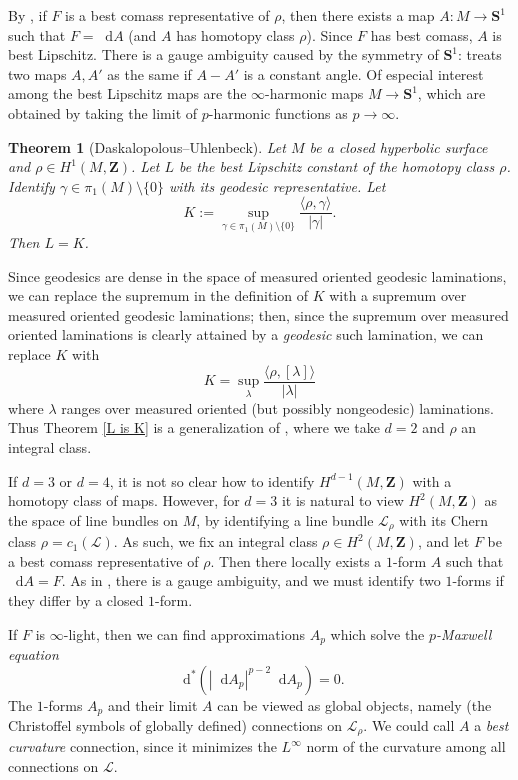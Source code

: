 \documentclass[reqno,11pt]{amsart}
\newcommand{\ZZ}{\mathbf{Z}}
\newcommand{\Sph}{\mathbf S}
\newcommand*\dif{\mathop{}\!\mathrm{d}}
\newcommand{\dfn}[1]{\emph{#1}\index{#1}}
\newtheorem{theorem}{Theorem}[section]
\theoremstyle{definition}
\numberwithin{equation}{section}
\begin{document}
By \cite[\S2.1]{daskalopoulos2020transverse}, if $F$ is a best comass representative of $\rho$, then there exists a map $A: M \to \Sph^1$ such that $F = \dif A$ (and $A$ has homotopy class $\rho$).
Since $F$ has best comass, $A$ is best Lipschitz.
There is a gauge ambiguity caused by the symmetry of $\Sph^1$: \cite{daskalopoulos2020transverse} treats two maps $A, A'$ as the same if $A - A'$ is a constant angle.
Of especial interest among the best Lipschitz maps are the $\infty$-harmonic maps $M \to \Sph^1$, which are obtained by taking the limit of $p$-harmonic functions as $p \to \infty$.

\begin{theorem}[Daskalopolous--Uhlenbeck]
Let $M$ be a closed hyperbolic surface and $\rho \in H^1(M, \ZZ)$.
Let $L$ be the best Lipschitz constant of the homotopy class $\rho$.
Identify $\gamma \in \pi_1(M) \setminus \{0\}$ with its geodesic representative.
Let
$$K := \sup_{\gamma \in \pi_1(M) \setminus \{0\}} \frac{\langle \rho, \gamma\rangle}{|\gamma|}.$$
Then $L = K$.
\end{theorem}

Since geodesics are dense in the space of measured oriented geodesic laminations, we can replace the supremum in the definition of $K$ with a supremum over measured oriented geodesic laminations; then, since the supremum over measured oriented laminations is clearly attained by a \emph{geodesic} such lamination, we can replace $K$ with 
$$K = \sup_\lambda \frac{\langle \rho, [\lambda]\rangle}{|\lambda|}$$
where $\lambda$ ranges over measured oriented (but possibly nongeodesic) laminations.
Thus Theorem \ref{L is K} is a generalization of \cite[Theorem 5.8]{daskalopoulos2020transverse}, where we take $d = 2$ and $\rho$ an integral class.

If $d = 3$ or $d = 4$, it is not so clear how to identify $H^{d - 1}(M, \ZZ)$ with a homotopy class of maps.
However, for $d = 3$ it is natural to view $H^2(M, \ZZ)$ as the space of line bundles on $M$, by identifying a line bundle $\mathscr L_\rho$ with its Chern class $\rho = c_1(\mathscr L)$.
As such, we fix an integral class $\rho \in H^2(M, \ZZ)$, and let $F$ be a best comass representative of $\rho$.
Then there locally exists a $1$-form $A$ such that $\dif A = F$.
As in \cite{daskalopoulos2020transverse}, there is a gauge ambiguity, and we must identify two $1$-forms if they differ by a closed $1$-form.

If $F$ is $\infty$-light, then we can find approximations $A_p$ which solve the \dfn{$p$-Maxwell equation}
$$\dif^* (|\dif A_p|^{p - 2} \dif A_p) = 0.$$
The $1$-forms $A_p$ and their limit $A$ can be viewed as global objects, namely (the Christoffel symbols of globally defined) connections on $\mathscr L_\rho$.
We could call $A$ a \dfn{best curvature} connection, since it minimizes the $L^\infty$ norm of the curvature among all connections on $\mathscr L$.
\end{document}
